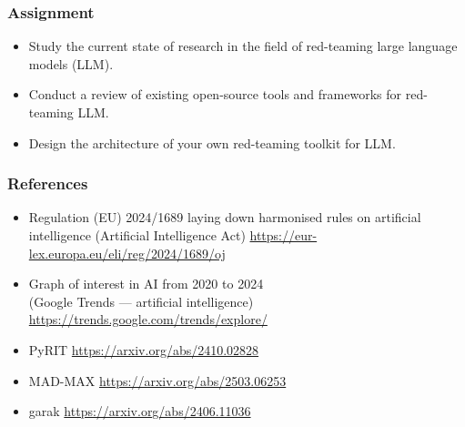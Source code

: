 
\appendix{}
\begin{frame}
  \frametitle{Assignment}
  \begin{itemize}
    \item Study the current state of research in the field of red-teaming large language models (LLM).
    \item Conduct a review of existing open-source tools and frameworks for red-teaming LLM.
    \item Design the architecture of your own red-teaming toolkit for LLM.
  \end{itemize}
\end{frame}

\begin{frame}
  \frametitle{References}
    \begin{itemize}
      \item Regulation (EU) 2024/1689 laying down harmonised rules on artificial intelligence (Artificial Intelligence Act) \url{https://eur-lex.europa.eu/eli/reg/2024/1689/oj}
      \item Graph of interest in AI from 2020 to 2024\\(Google Trends --- artificial intelligence) \url{https://trends.google.com/trends/explore/}
      \item PyRIT \url{https://arxiv.org/abs/2410.02828}
      \item MAD-MAX \url{https://arxiv.org/abs/2503.06253}
      \item garak \url{https://arxiv.org/abs/2406.11036}
    \end{itemize}
\end{frame}